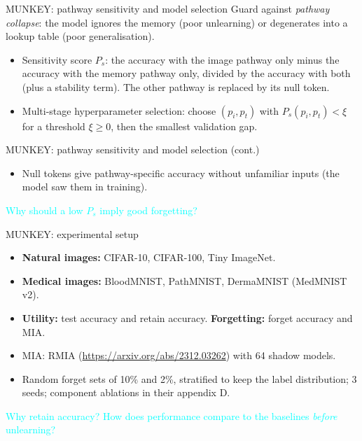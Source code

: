 \documentclass{beamer}
\newcommand{\pierre}[1]{\textcolor{cyan}{#1}}
\begin{document}
\begin{frame}{MUNKEY: pathway sensitivity and model selection}
Guard against \emph{pathway collapse}: the model ignores the memory (poor
unlearning) or degenerates into a lookup table (poor generalisation).

\medskip
\begin{itemize}
  \item Sensitivity score $P_s$: the accuracy with the image pathway only minus
        the accuracy with the memory pathway only, divided by the accuracy with
        both (plus a stability term). The other pathway is replaced by its null
        token.
  \item Multi-stage hyperparameter selection: choose $(p_i, p_t)$ with
        $P_s(p_i, p_t) < \xi$ for a threshold $\xi \ge 0$, then the smallest
        validation gap.
\end{itemize}
\end{frame}

\begin{frame}{MUNKEY: pathway sensitivity and model selection (cont.)}
\begin{itemize}
  \item Null tokens give pathway-specific accuracy without unfamiliar inputs
        (the model saw them in training).
\end{itemize}

\medskip
\pierre{Why should a low $P_s$ imply good forgetting?}
\end{frame}

\begin{frame}{MUNKEY: experimental setup}
\begin{itemize}
  \item \textbf{Natural images:} CIFAR-10, CIFAR-100, Tiny ImageNet.
  \item \textbf{Medical images:} BloodMNIST, PathMNIST, DermaMNIST (MedMNIST v2).
  \item \textbf{Utility:} test accuracy and retain accuracy.
        \textbf{Forgetting:} forget accuracy and MIA.
  \item MIA: RMIA (\url{https://arxiv.org/abs/2312.03262}) with 64 shadow models.
  \item Random forget sets of 10\% and 2\%, stratified to keep the label
        distribution; 3 seeds; component ablations in their appendix D.
\end{itemize}

\medskip
\pierre{Why retain accuracy? How does performance compare to the baselines
\emph{before} unlearning?}
\end{frame}
\end{document}
